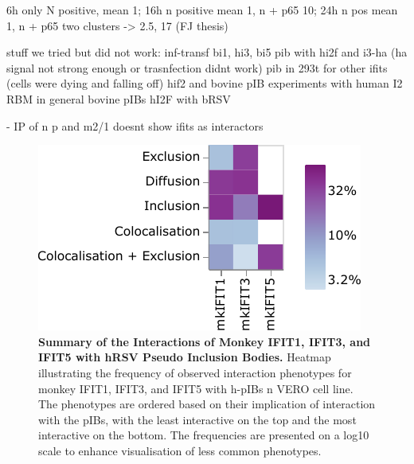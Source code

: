 6h only N positive, mean 1; 16h n positive mean 1, n + p65 10; 24h n pos mean 1, n + p65 two clusters -> 2.5, 17 (FJ thesis)

stuff we tried but did not work: 
inf-transf bi1, hi3, bi5
pib with hi2f and i3-ha (ha signal not strong enough or trasnfection didnt work)
pib in 293t for other ifits (cells were dying and falling off)
hif2 and bovine pIB
experiments with human I2 RBM
in general bovine pIBs
hI2F with bRSV



\cite{Oliveira2013HumanCells} - IP of n p and m2/1 doesnt show ifits as interactors 

\begin{figure}
    \centering
    \includegraphics[width=0.6\linewidth]{09. Chapter 4/Figs/heatmap-vero-hnhp-i135.pdf}
    \caption[Summary of the Interactions of Monkey IFIT1, IFIT3, and IFIT5 with hRSV Pseudo Inclusion Bodies.]{\textbf{Summary of the Interactions of Monkey IFIT1, IFIT3, and IFIT5 with hRSV Pseudo Inclusion Bodies.} Heatmap illustrating the frequency of observed interaction phenotypes for monkey IFIT1, IFIT3, and IFIT5 with h-pIBs n VERO cell line. The phenotypes are ordered based on their implication of interaction with the pIBs, with the least interactive on the top and the most interactive on the bottom. The frequencies are presented on a log10 scale to enhance visualisation of less common phenotypes.}
    \label{fig:Summary of the Interactions of Monkey IFIT1, IFIT3, and IFIT5 with hRSV Pseudo Inclusion Bodies}
\end{figure}


